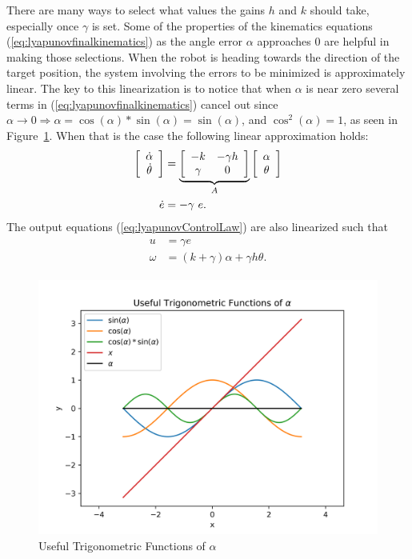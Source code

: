 There are many ways to select what values the gains $h$ and $k$ should take, especially once $\gamma$ is set.
Some of the properties of the kinematics equations (\ref{eq:lyapunovfinalkinematics}) as the angle error $\alpha$ approaches $0$ are helpful in making those selections.
When the robot is heading towards the direction of the target position, the system involving the errors to be minimized is approximately linear.
The key to this linearization is to notice that when $\alpha$ is near zero several terms in (\ref{eq:lyapunovfinalkinematics}) cancel out since $\alpha\to0\Rightarrow \alpha=\cos(\alpha)*\sin(\alpha)=\sin(\alpha)$, and $\cos^2(\alpha)=1$, as seen in Figure~\ref{fig:plotSinCos}.
When that is the case the following linear approximation holds:
\begin{align}
\label{eq:lyapunovLinearSystem}
\begin{split}
\left[\begin{array}{c} \dot{\alpha} \\ \dot{\theta} \end{array}\right]
&= \underbrace{\left[\begin{array}{c c} -k & -\gamma h \\ \gamma & 0 \end{array}\right]}_{A}
\left[\begin{array}{c} \alpha \\ \theta \end{array}\right] \\
\dot{e} &= -\gamma~e.
\end{split}
\end{align}
The output equations (\ref{eq:lyapunovControlLaw}) are also linearized such that
\begin{align}
\label{eq:lyapunovLinearOutput}
\begin{split}
u &= \gamma e \\
\omega &= (k+\gamma)\alpha + \gamma h\theta.
\end{split}
\end{align}

\begin{figure}[ht!]
\centering
\includegraphics[width=.75\textwidth]{images/plotSinCos}
\caption{Useful Trigonometric Functions of $\alpha$}%
\label{fig:plotSinCos}
\end{figure}

